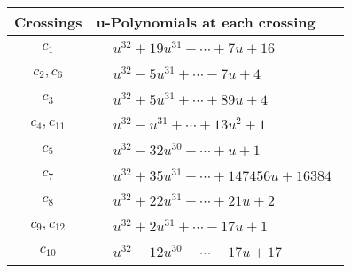 \documentclass[1p]{elsarticle_modified}
\theoremstyle{definition}
\begin{document}
\begin{tabular}{m{50pt}|m{274pt}}
Crossings & \hspace{64pt}u-Polynomials at each crossing \\
\hline $$\begin{aligned}c_{1}\end{aligned}$$&$\begin{aligned}
&u^{32}+19 u^{31}+\cdots+7 u+16
\end{aligned}$\\
\hline $$\begin{aligned}c_{2},c_{6}\end{aligned}$$&$\begin{aligned}
&u^{32}-5 u^{31}+\cdots-7 u+4
\end{aligned}$\\
\hline $$\begin{aligned}c_{3}\end{aligned}$$&$\begin{aligned}
&u^{32}+5 u^{31}+\cdots+89 u+4
\end{aligned}$\\
\hline $$\begin{aligned}c_{4},c_{11}\end{aligned}$$&$\begin{aligned}
&u^{32}- u^{31}+\cdots+13 u^2+1
\end{aligned}$\\
\hline $$\begin{aligned}c_{5}\end{aligned}$$&$\begin{aligned}
&u^{32}-32 u^{30}+\cdots+u+1
\end{aligned}$\\
\hline $$\begin{aligned}c_{7}\end{aligned}$$&$\begin{aligned}
&u^{32}+35 u^{31}+\cdots+147456 u+16384
\end{aligned}$\\
\hline $$\begin{aligned}c_{8}\end{aligned}$$&$\begin{aligned}
&u^{32}+22 u^{31}+\cdots+21 u+2
\end{aligned}$\\
\hline $$\begin{aligned}c_{9},c_{12}\end{aligned}$$&$\begin{aligned}
&u^{32}+2 u^{31}+\cdots-17 u+1
\end{aligned}$\\
\hline $$\begin{aligned}c_{10}\end{aligned}$$&$\begin{aligned}
&u^{32}-12 u^{30}+\cdots-17 u+17
\end{aligned}$\\
\hline
\end{tabular}\\~\\
\end{document}
